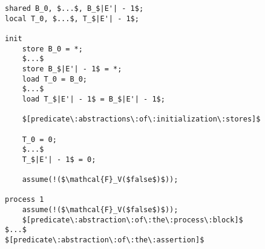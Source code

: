 \begin{lstlisting}[frame=single, mathescape]
shared B_0, $...$, B_$|E'| - 1$;
local T_0, $...$, T_$|E'| - 1$;

init
	store B_0 = *;
	$...$
	store B_$|E'| - 1$ = *;
	load T_0 = B_0;
	$...$
	load T_$|E'| - 1$ = B_$|E'| - 1$;
	
	$[predicate\:abstractions\:of\:initialization\:stores]$

	T_0 = 0;
	$...$
	T_$|E'| - 1$ = 0;
	
	assume(!($\mathcal{F}_V($false$)$));

process 1
	assume(!($\mathcal{F}_V($false$)$));
	$[predicate\:abstraction\:of\:the\:process\:block]$
$...$
$[predicate\:abstraction\:of\:the\:assertion]$
\end{lstlisting}